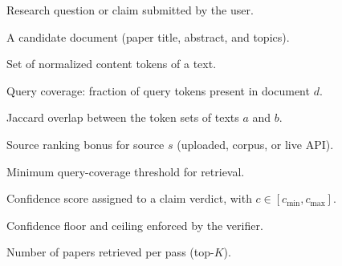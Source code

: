 
\begin{description}[style=nextline,leftmargin=1.7in,labelwidth=1.35in,font=\normalfont\bfseries]
\item[\(q\)] Research question or claim submitted by the user.
\item[\(d\)] A candidate document (paper title, abstract, and topics).
\item[\(T(\cdot)\)] Set of normalized content tokens of a text.
\item[\(\mathrm{cov}(q,d)\)] Query coverage: fraction of query tokens present in document \(d\).
\item[\(\mathrm{ovl}(a,b)\)] Jaccard overlap between the token sets of texts \(a\) and \(b\).
\item[\(b_s\)] Source ranking bonus for source \(s\) (uploaded, corpus, or live API).
\item[\(\tau_{\mathrm{cov}}\)] Minimum query-coverage threshold for retrieval.
\item[\(c\)] Confidence score assigned to a claim verdict, with \(c \in [c_{\min}, c_{\max}]\).
\item[\(c_{\min},\,c_{\max}\)] Confidence floor and ceiling enforced by the verifier.
\item[\(K\)] Number of papers retrieved per pass (top-\(K\)).
\end{description}
\clearpage
